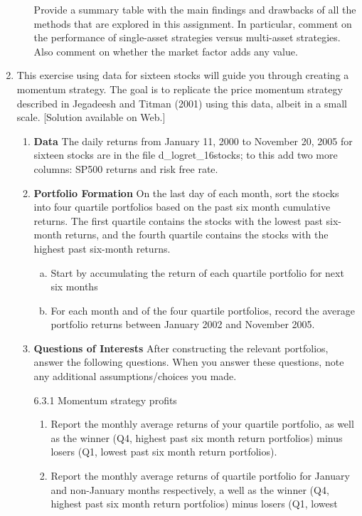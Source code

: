 \begin{enumerate}[1.]
\begin{enumerate}
Provide a summary table with the main findings and drawbacks of all the methods that are explored in this assignment. In particular, comment on the performance of single-asset strategies versus multi-asset strategies. Also comment on whether the market factor adds any value.
\end{enumerate}
\item This exercise using data for sixteen stocks will guide you through creating a momentum strategy. The goal is to replicate the price momentum strategy described in Jegadeesh and Titman (2001) using this data, albeit in a small scale. [Solution available on Web.]
    \begin{enumerate}[6.1]
    \item \textbf{Data} \hfill \break
    The daily returns from January 11, 2000 to November 20, 2005 for sixteen stocks are in the file d\_logret\_16stocks;
to this add two more columns: SP500 returns and risk free rate.
    \item \textbf{Portfolio Formation} \hfill \break
    On the last day of each month, sort the stocks into four quartile portfolios based on the past six month
cumulative returns. The first quartile contains the stocks with the lowest past six-month returns, and the
fourth quartile contains the stocks with the highest past six-month returns.
        \begin{enumerate}[(a)]
        \item Start by accumulating the return of each quartile portfolio for next six months
        \item For each month and of the four quartile portfolios, record the average portfolio returns between January 2002 and November 2005.
        \end{enumerate}
    \item \textbf{Questions of Interests} \hfill \break
    After constructing the relevant portfolios, answer the following questions. When you answer these questions, note any additional assumptions/choices you made.
    \hfill
\par\vspace{\baselineskip}
    6.3.1 Momentum strategy profits
    \begin{enumerate}[1.]
    \item Report the monthly average returns of your quartile portfolio, as well as the winner (Q4, highest
past six month return portfolios) minus losers (Q1, lowest past six month return portfolios).
    \item Report the monthly average returns of quartile portfolio for January and non-January months respectively, a well as the winner (Q4, highest past six month return portfolios) minus losers (Q1, lowest

\end{enumerate}
\end{enumerate}
\end{enumerate}
